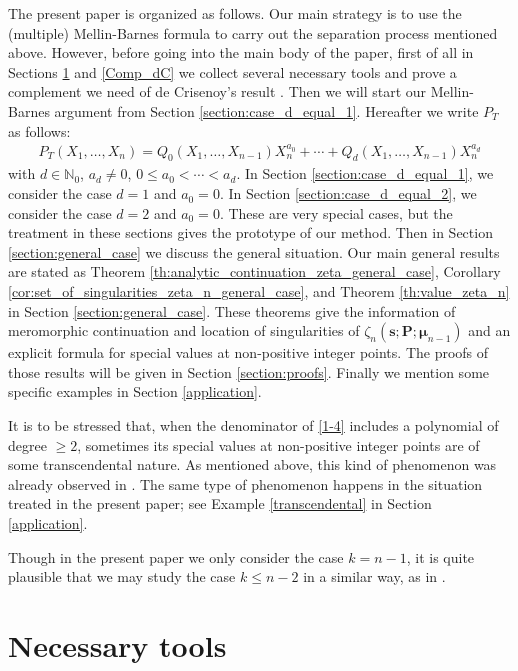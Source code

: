 \documentclass[a4paper,12pt]{article}
\theoremstyle{definition}
\numberwithin{equation}{section}
\begin{document}
The present paper is organized as follows.    Our main strategy is to use the (multiple)
Mellin-Barnes formula to carry out the separation process mentioned above.
However, before going into the main body of the paper, first of all in Sections \ref{preparation} and \ref{Comp_dC}
we collect several necessary tools and prove a complement we need of de Crisenoy's result \cite{dC}. Then we will start our Mellin-Barnes argument from Section \ref{section:case_d_equal_1}.
Hereafter we write $P_T$ as follows:
\begin{align}\label{1-5}
P_T(X_1,\ldots,X_n) = Q_0(X_1,\ldots,X_{n-1}) X_n^{a_0} + \cdots + Q_d(X_1,\ldots,X_{n-1}) X_n^{a_d}
\end{align}
with $d \in \mathbb{N}_0$, $a_d \neq 0$, $0 \leq a_0 < \cdots < a_d$.
In Section \ref{section:case_d_equal_1}, we consider the case $d=1$ and $a_0=0$.
In Section \ref{section:case_d_equal_2}, we consider the case $d=2$ and $a_0=0$.   These are very special cases, but the treatment in these sections gives the
prototype of our method.    Then in Section \ref{section:general_case} we discuss the general
situation.
Our main general results are stated as Theorem
\ref{th:analytic_continuation_zeta_general_case}, Corollary
\ref{cor:set_of_singularities_zeta_n_general_case}, and Theorem
\ref{th:value_zeta_n} in Section \ref{section:general_case}.
These theorems give the information of meromorphic continuation
and location of singularities of $\zeta_n(\mathbf{s};\mathbf{P};\boldsymbol{\mu}_{n-1})$
and an explicit formula for special values at non-positive integer points.
The proofs of those results will be given in Section \ref{section:proofs}.
Finally we mention some specific examples in Section \ref{application}.

It is to be stressed that, when the denominator of \eqref{1-4}
includes a polynomial of degree $\geq 2$, sometimes its special
values at non-positive integer points are of some transcendental nature.    As mentioned above, this kind of phenomenon was already observed in \cite{EM21}.    The same type of phenomenon happens
in the situation treated in the present paper; see 
Example \ref{transcendental} in Section \ref{application}.

Though in the present paper we only consider the case $k=n-1$, it is quite plausible that we may study the case $k\leq n-2$ in a similar way, as in \cite{CMUSP}.

\section{Necessary tools}
\label{preparation}
\end{document}
